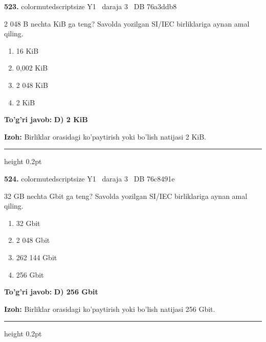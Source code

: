 \documentclass[10pt,a4paper,oneside]{article}
\begin{document}
\noindent\textbf{\color{ink}523.}  {color{muted}scriptsize Y1 \textbullet\ daraja 3 \textbullet\ DB 76a3ddb8}
\par
2 048 B nechta KiB ga teng? Savolda yozilgan SI/IEC birliklariga aynan amal qiling.
\begin{enumerate}[label=\Alph*),leftmargin=9mm]
\item 16 KiB
\item 0,002 KiB
\item 2 048 KiB
\item 2 KiB
\end{enumerate}
\begin{tcolorbox}[enhanced,breakable,colback=teal!4,colframe=teal!50!black,boxrule=0.5pt,arc=1.1mm,left=3mm,right=3mm,top=1.7mm,bottom=1.7mm,before skip=2mm,after skip=2mm]
\textbf{\color{teal}To'g'ri javob:} \textbf{D) 2 KiB}
\par\smallskip
\textbf{Izoh:} Birliklar orasidagi ko'paytirish yoki bo'lish natijasi 2 KiB.
\end{tcolorbox}
\vspace{2mm}\hrule height 0.2pt \vspace{3mm}

\noindent\textbf{\color{ink}524.}  {color{muted}scriptsize Y1 \textbullet\ daraja 3 \textbullet\ DB 76c8491e}
\par
32 GB nechta Gbit ga teng? Savolda yozilgan SI/IEC birliklariga aynan amal qiling.
\begin{enumerate}[label=\Alph*),leftmargin=9mm]
\item 32 Gbit
\item 2 048 Gbit
\item 262 144 Gbit
\item 256 Gbit
\end{enumerate}
\begin{tcolorbox}[enhanced,breakable,colback=teal!4,colframe=teal!50!black,boxrule=0.5pt,arc=1.1mm,left=3mm,right=3mm,top=1.7mm,bottom=1.7mm,before skip=2mm,after skip=2mm]
\textbf{\color{teal}To'g'ri javob:} \textbf{D) 256 Gbit}
\par\smallskip
\textbf{Izoh:} Birliklar orasidagi ko'paytirish yoki bo'lish natijasi 256 Gbit.
\end{tcolorbox}
\vspace{2mm}\hrule height 0.2pt \vspace{3mm}
\end{document}
